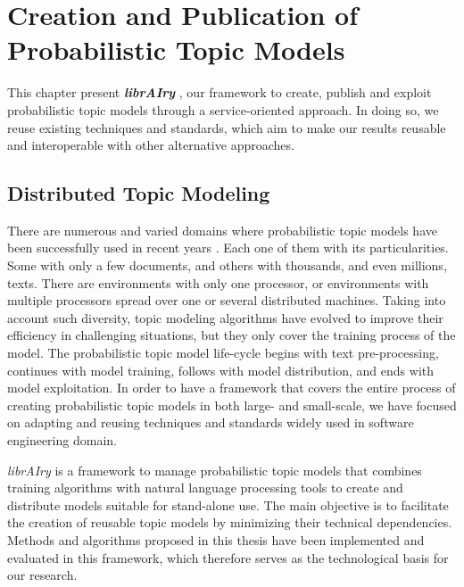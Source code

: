 

\chapter{Creation and Publication of Probabilistic Topic Models}\label{ch:scalability}

\graphicspath{{scalability/figures/}}


This chapter present \textit{\textbf{librAIry}} \citep{Badenes-Olmedo2017}, our framework to create, publish and exploit probabilistic topic models through a service-oriented approach. In doing so, we reuse existing techniques and standards, which aim to make our results reusable and interoperable with other alternative approaches.


\section{Distributed Topic Modeling}


There are numerous and varied domains where probabilistic topic models have been successfully used in recent years \citep{TapiNzali2017, ONeill2017, Greene2016, He2017}. Each one of them with its particularities. Some with only a few documents, and others with thousands, and even millions, texts. There are environments with only one processor, or environments with multiple processors spread over one or several distributed machines. Taking into account such diversity, topic modeling algorithms have evolved to improve their efficiency in challenging situations, but they only cover the training process of the model. The probabilistic topic model life-cycle begins with text pre-processing, continues with model training, follows with model distribution, and ends with model exploitation. In order to have a framework that covers the entire process of creating probabilistic topic models in both large- and small-scale, we have focused on adapting and reusing techniques and standards widely used in software engineering domain. 

\textit{librAIry} is a framework to manage probabilistic topic models that combines training algorithms with natural language processing tools to create and distribute models suitable for stand-alone use. The main objective is to facilitate the creation of reusable topic models by minimizing their technical dependencies. Methods and algorithms proposed in this thesis have been implemented and evaluated in this framework, which therefore serves as the technological basis for our research.

